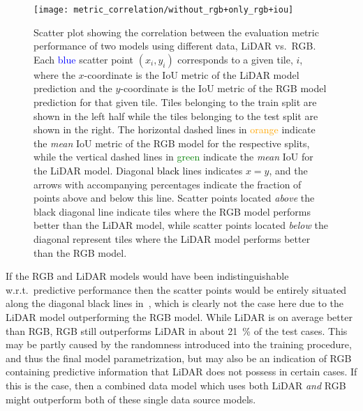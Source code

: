 \begin{figure}[H]
  \centering
  \texttt{[image: metric\_correlation/without\_rgb+only\_rgb+iou]}
  \caption{%
    Scatter plot showing the correlation between the evaluation metric performance of two models using different data, LiDAR vs.\ RGB\@.
    Each \textcolor{blue}{blue} scatter point $(x_i, y_i)$ corresponds to a given tile, $i$, where the $x$-coordinate is the IoU metric of the LiDAR model prediction and the $y$-coordinate is the IoU metric of the RGB model prediction for that given tile.
    Tiles belonging to the train split are shown in the left half while the tiles belonging to the test split are shown in the right.
    The horizontal dashed lines in \textcolor{orange}{orange} indicate the \emph{mean} IoU metric of the RGB model for the respective splits, while the vertical dashed lines in \textcolor{green}{green} indicate the \emph{mean} IoU for the LiDAR model.
    Diagonal \textcolor{black}{black} lines indicates $x = y$, and the arrows with accompanying percentages indicate the fraction of points above and below this line.
    Scatter points located \emph{above} the black diagonal line indicate tiles where the RGB model performs better than the LiDAR model, while scatter points located \emph{below} the diagonal represent tiles where the LiDAR model performs better than the RGB model.
  }%
  \label{fig:rgb-lidar-correlation}\label{fig:correlation-explanation}
\end{figure}

If the RGB and LiDAR models would have been indistinguishable w.r.t.\ predictive performance then the scatter points would be entirely situated along the diagonal black lines in~, which is clearly not the case here due to the LiDAR model outperforming the RGB model.
While LiDAR is on average better than RGB, RGB still outperforms LiDAR in about \SI{21}{\percent} of the test cases.
This may be partly caused by the randomness introduced into the training procedure, and thus the final model parametrization, but may also be an indication of RGB containing predictive information that LiDAR does not possess in certain cases.
If this is the case, then a combined data model which uses both LiDAR \emph{and} RGB might outperform both of these single data source models.

